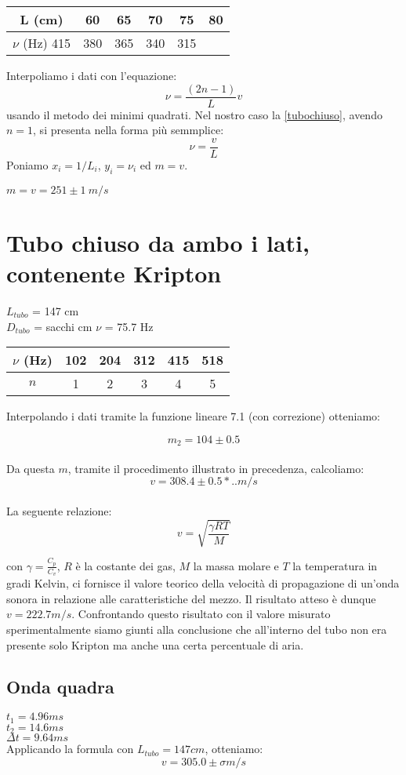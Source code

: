 \begin{center}
\begin{tabular}{*{5}{c|}c}
L (cm) & 60 & 65 & 70 & 75 & 80 \\
\midrule
$\nu$ (Hz) 415 & 380 & 365 & 340 & 315\\
\end{tabular}
\end{center}
Interpoliamo i dati con l'equazione:
\begin{equation}\label{tubochiuso}
\nu=\frac{(2n-1)}{L}v
\end{equation} 
usando il metodo dei minimi quadrati. Nel nostro caso la \ref{tubochiuso}, avendo $n=1$, si presenta nella forma più semmplice:
$$\nu=\frac{v}{L}$$
Poniamo $x_i=1/L_i$, $y_i=\nu_i$ ed $m=v$.

\begin{center}

$m = v = 251\pm 1\ m/s$
\end{center}

\section{Tubo chiuso da ambo i lati, contenente Kripton}

$L_{tubo}$ = 147 cm\\
$D_{tubo}$ = sacchi cm
$\nu$ = 75.7 Hz
 


\begin{center}
\begin{tabular}{c|c|c|c|c|c}
$\nu$ (Hz) & 102 & 204 & 312 & 415 & 518 \\
\midrule
$n$ & 1 & 2 & 3 & 4 & 5\\
\end{tabular}
\end{center}

Interpolando i dati tramite la funzione lineare 7.1 (con correzione) otteniamo:

$$ m_2 = 104 \pm 0.5 $$ 
\\
Da questa $m$, tramite il procedimento illustrato in precedenza, calcoliamo: 
$$v = 308.4\pm0.5*..  m/s $$
\\
La seguente relazione:
$$v=\sqrt{\frac{\gamma RT}{M}}$$

con $\gamma = \frac{C_p}{C_v}$, $R$ è la costante dei gas, $M$ la massa molare e $T$ la temperatura in gradi Kelvin, ci fornisce il valore teorico della velocità di propagazione di un'onda sonora in relazione alle caratteristiche del mezzo. 
Il risultato atteso è dunque $v=222.7 m/s$. Confrontando questo risultato con il valore misurato sperimentalmente siamo giunti alla conclusione che all'interno del tubo non era presente solo Kripton ma anche una certa percentuale di aria.

\subsection{Onda quadra}
$t_1 = 4.96 ms $\\
$t_2 = 14.6 ms $\\
$\Delta t = 9.64 ms $ \\
Applicando la formula  con $L_{tubo} = 147 cm$, otteniamo:
$$ v = 305.0 \pm \sigma m/s $$ 



